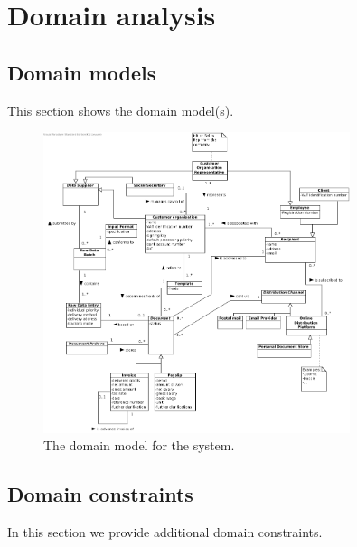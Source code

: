 \documentclass[a4paper,10pt]{article}
\begin{document}


\tableofcontents
\newpage

\section{Domain analysis}\label{sec:domain}
\subsection{Domain models}
This section shows the domain model(s).

\begin{figure}[!htp]
    \centering
    \includegraphics[width=0.8\textwidth]{domain_model.png}
    \caption{The domain model for the system.}\label{fig:domain_model}
\end{figure}

\subsection{Domain constraints}
In this section we provide additional domain constraints.
\end{document}
